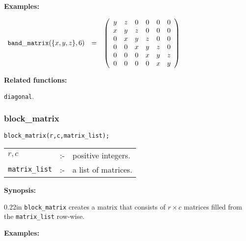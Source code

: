 {\bf Examples:}

\begin{flushleft}  
\hspace*{0.1in}
\begin{math}  
\begin{array}{ccc}
{\tt band\_matrix}(\{x,y,z\},6) & = & 
\left( \begin{array}{cccccc} y & z & 0 & 0 & 0 & 0 \\ x & y & z & 0 & 0
& 0 \\ 0 & x & y & z & 0 & 0 \\ 0 & 0 & x & y & z & 0 \\ 0 & 0 & 0 & x &
 y & z \\ 0 & 0 & 0 & 0 & x & y 
\end{array} \right)
\end{array}  
\end{math}  
\end{flushleft}

{\bf Related functions:} 

\hspace*{0.175in} {\tt diagonal}.


\subsubsection{block\_matrix}
\label{linalg:block_matrix}

\hspace*{0.175in} {\tt block\_matrix(r,c,matrix\_list);}

\hspace*{0.1in}
\begin{tabular}{l l l}
$r,c$          &:-& positive integers. \\
\texttt{matrix\_list} &:-& a list of matrices. 
\end{tabular}

{\bf Synopsis:} %

\begin{addtolength}{\leftskip}{0.22in}
{\tt block\_matrix} creates a matrix that consists of $r\times c$ matrices 
filled from the \texttt{matrix\_list} row-wise.

\end{addtolength}


{\bf Examples:}


